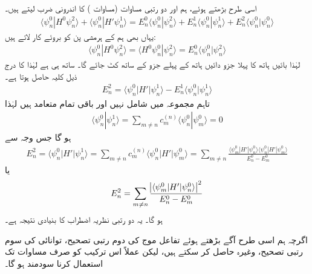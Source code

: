  اسی طرح بڑھتے ہوئے، ہم  اور دو رتبی مساوات (مساوات ) کا اندرونی ضرب لیتے ہیں۔
\begin{align*}
\langle \psi_n^0 | H^0 \psi_n^2 \rangle + \langle \psi_n^0 | H' \psi_n^1 \rangle = E_n^0 \langle \psi_n^0 | \psi_n^2 \rangle + E_n^1 \langle \psi_n^0 | \psi_n^1 \rangle + E_n^2 \langle \psi_n^0 | \psi_n^0 \rangle
\end{align*}
یہاں بھی ہم  کے ہرمشی پن کو بروئے کار لاتے ہیں: 
\begin{align*}
\langle \psi_n^0 | H^0 \psi_n^2 \rangle = \langle H^0 \psi_n^0 | \psi_n^2 \rangle = E_n^0 \langle \psi_n^0 | \psi_n^2 \rangle
\end{align*}
 لہٰذا بائیں ہاتھ کا پہلا جزو دائیں ہاتھ کے پہلے جزو کے ساتھ کٹ جائے گا۔ ساتھ ہی  ہے لہٰذا  کا درج ذیل کلیہ حاصل ہوتا ہے۔
\begin{align}\label{مساوات_غیر_مضطرب_دوم_رتبی_تصحیح}
E_n^2 = \langle \psi_n^0 | H' | \psi_n^1 \rangle - E_n^1 \langle \psi_n^0 | \psi_n^1 \rangle
\end{align}
تاہم مجموعہ میں  شامل نہیں اور باقی تمام متعامد ہیں لہٰذا 
\begin{align*}
\langle \psi_n^0 | \psi_n^1 \rangle = \sum_{m \ne n} c_m^{(n)} \langle \psi_n^0 | \psi_m^0 \rangle = 0
\end{align*}
 ہو گا جس وجہ سے 
\begin{align*}
E_n^2 = \langle \psi_n^0 | H' | \psi_n^1 \rangle = \sum_{m \ne n} c_m^{(n)} \langle \psi_n^0 | H' | \psi_m^0 \rangle = \sum_{m \ne n} \frac{\langle \psi_m^0 | H' | \psi_n^0 \rangle \langle \psi_n^0 | H' | \psi_m^0 \rangle }{E_n^0 - E_m^0}
\end{align*}
یا 
\begin{align}\label{مساوات_غیر_اضطراب_دوم_رتبی_نتیجہ}
E_n^2 = \sum_{m \ne n} \frac{ \abs{ \langle \psi_m^0 | H' | \psi_n^0\rangle }^2 }{E_n^0 - E_m^0}
\end{align}
 ہو گا۔ یہ دو رتبی نظریہ اضطراب کا بنیادی نتیجہ ہے۔

 اگرچہ ہم اسی طرح آگے بڑھتے ہوئے تفاعل موج  کی دوم رتبی تصحیح، توانائی کی سوم رتبی تصحیح، وغیرہ حاصل کر سکتے ہیں، لیکن عملاً اس ترکیب کو صرف مساوات  تک استعمال کرنا سودمند ہو گا۔
 
